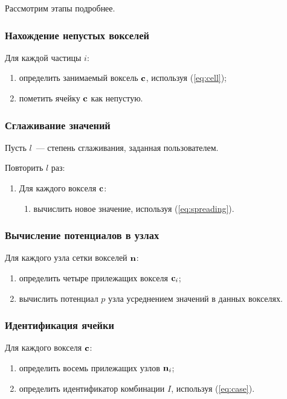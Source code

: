 Рассмотрим этапы подробнее.


\subsubsection{Нахождение непустых вокселей}
Для каждой частицы $i$:
\begin{enumerate}
  \item определить занимаемый воксель $\boldsymbol{\mathbf{c}}$, используя (\ref{eq:cell});
  \item пометить ячейку $\boldsymbol{\mathbf{c}}$ как непустую.
\end{enumerate}


\subsubsection{Сглаживание значений}
Пусть $l$~--- степень сглаживания, заданная пользователем.

Повторить $l$ раз:
\begin{enumerate}
  \item Для каждого вокселя $\boldsymbol{\mathbf{c}}$:
    \begin{enumerate}
      \item вычислить новое значение, используя (\ref{eq:spreading}).
    \end{enumerate}
\end{enumerate}


\subsubsection{Вычисление потенциалов в узлах}
Для каждого узла сетки вокселей $\boldsymbol{\mathbf{n}}$:
\begin{enumerate}
  \item определить четыре прилежащих вокселя $\boldsymbol{\mathbf{c}}_i$;
  \item вычислить потенциал $p$ узла усреднением значений в данных вокселях.
\end{enumerate}


\subsubsection{Идентификация ячейки}
Для каждого вокселя $\boldsymbol{\mathbf{c}}$:
\begin{enumerate}
  \item определить восемь прилежащих узлов $\boldsymbol{\mathbf{n}}_i$;
  \item определить идентификатор комбинации $I$, используя (\ref{eq:case}).
\end{enumerate}


